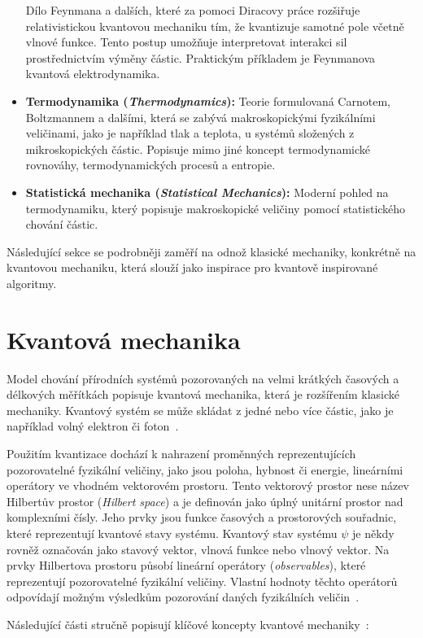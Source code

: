 \begin{itemize}
    Dílo Feynmana a dalších, které za pomoci Diracovy práce rozšiřuje relativistickou kvantovou mechaniku tím, že kvantizuje samotné pole včetně vlnové funkce. 
    Tento postup umožňuje interpretovat interakci sil prostřednictvím výměny částic. 
    Praktickým příkladem je Feynmanova kvantová elektrodynamika. 
    \item \textbf{Termodynamika (\emph{Thermodynamics}):} 
    Teorie formulovaná Carnotem, Boltzmannem a dalšími, která se zabývá makroskopickými fyzikálními veličinami, jako je například tlak a teplota, u systémů složených z mikroskopických částic. 
    Popisuje mimo jiné koncept termodynamické rovnováhy, termodynamických procesů a entropie. 
    \item \textbf{Statistická mechanika (\emph{Statistical Mechanics}):} 
    Moderní pohled na termodynamiku, který popisuje makroskopické veličiny pomocí statistického chování částic.
\end{itemize}

Následující sekce se podrobněji zaměří na odnož klasické mechaniky, konkrétně na kvantovou mechaniku, která slouží jako inspirace pro kvantově inspirované algoritmy.

\section{Kvantová mechanika}
Model chování přírodních systémů pozorovaných na velmi krátkých časových a délkových měřítkách popisuje kvantová mechanika, která je rozšířením klasické mechaniky. 
Kvantový systém se může skládat z jedné nebo více částic, jako je například volný elektron či foton~\cite{NaturalComputing}. 

Použitím kvantizace dochází k nahrazení proměnných reprezentujících pozorovatelné fyzikální veličiny, jako jsou poloha, hybnost či energie, lineárními operátory ve vhodném vektorovém prostoru. 
Tento vektorový prostor nese název Hilbertův prostor (\emph{Hilbert space}) a je definován jako úplný unitární prostor nad komplexními čísly. 
Jeho prvky jsou funkce časových a prostorových souřadnic, které reprezentují kvantové stavy systému. 
Kvantový stav systému $\psi$ je někdy rovněž označován jako stavový vektor, vlnová funkce nebo vlnový vektor. 
Na prvky Hilbertova prostoru působí lineární operátory (\emph{observables}), které reprezentují pozorovatelné fyzikální veličiny. 
Vlastní hodnoty těchto operátorů odpovídají možným výsledkům pozorování daných fyzikálních veličin~\cite{NaturalComputing}.

Následující části stručně popisují klíčové koncepty kvantové mechaniky~\cite{NaturalComputing}:

